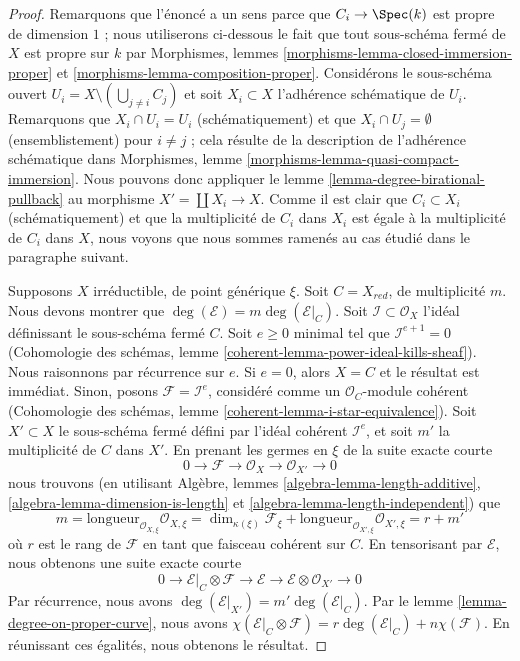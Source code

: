 \begin{proof}
Remarquons que l'énoncé a un sens parce que $C_i \to \Spec(k)$
est propre de dimension $1$ ; nous utiliserons ci-dessous le fait que tout sous-schéma fermé
de $X$ est propre sur $k$ par Morphismes, lemmes
\ref{morphisms-lemma-closed-immersion-proper} et
\ref{morphisms-lemma-composition-proper}. Considérons le sous-schéma ouvert
$U_i = X \setminus (\bigcup_{j \not = i} C_j)$ et soit $X_i \subset X$
l'adhérence schématique de $U_i$. Remarquons que $X_i \cap U_i = U_i$
(schématiquement) et que $X_i \cap U_j = \emptyset$
(ensemblistement) pour $i \not = j$ ; cela résulte de la description
de l'adhérence schématique dans
Morphismes, lemme \ref{morphisms-lemma-quasi-compact-immersion}.
Nous pouvons donc appliquer le lemme \ref{lemma-degree-birational-pullback} au morphisme
$X' = \coprod X_i \to X$. Comme il est clair que $C_i \subset X_i$
(schématiquement) et que la multiplicité de $C_i$ dans $X_i$ est égale
à la multiplicité de $C_i$ dans $X$, nous voyons que nous sommes ramenés au cas
étudié dans le paragraphe suivant.

\medskip\noindent
Supposons $X$ irréductible, de point générique $\xi$. Soit
$C = X_{red}$, de multiplicité $m$.
Nous devons montrer que $\deg(\mathcal{E}) = m \deg(\mathcal{E}|_C)$.
Soit $\mathcal{I} \subset \mathcal{O}_X$ l'idéal définissant le sous-schéma fermé
$C$. Soit $e \geq 0$ minimal tel que $\mathcal{I}^{e + 1} = 0$
(Cohomologie des schémas, lemme \ref{coherent-lemma-power-ideal-kills-sheaf}).
Nous raisonnons par récurrence sur $e$. Si $e = 0$, alors $X = C$ et le résultat
est immédiat. Sinon, posons $\mathcal{F} = \mathcal{I}^e$, considéré comme
un $\mathcal{O}_C$-module cohérent (Cohomologie des schémas, lemme
\ref{coherent-lemma-i-star-equivalence}).
Soit $X' \subset X$ le sous-schéma fermé défini par
l'idéal cohérent $\mathcal{I}^e$, et soit $m'$ la multiplicité
de $C$ dans $X'$. En prenant les germes en $\xi$ de la suite exacte courte
$$
0 \to \mathcal{F} \to \mathcal{O}_X \to \mathcal{O}_{X'} \to 0
$$
nous trouvons (en utilisant Algèbre, lemmes \ref{algebra-lemma-length-additive},
\ref{algebra-lemma-dimension-is-length} et
\ref{algebra-lemma-length-independent}) que
$$
m = \text{longueur}_{\mathcal{O}_{X, \xi}} \mathcal{O}_{X, \xi}
= \dim_{\kappa(\xi)} \mathcal{F}_\xi +
\text{longueur}_{\mathcal{O}_{X', \xi}} \mathcal{O}_{X', \xi}
= r + m'
$$
où $r$ est le rang de $\mathcal{F}$ en tant que faisceau cohérent sur $C$.
En tensorisant par $\mathcal{E}$, nous obtenons une suite exacte courte
$$
0 \to \mathcal{E}|_C \otimes \mathcal{F} \to \mathcal{E} \to
\mathcal{E} \otimes \mathcal{O}_{X'} \to 0
$$
Par récurrence, nous avons
$\deg(\mathcal{E}|_{X'}) = m' \deg(\mathcal{E}|_C)$.
Par le lemme \ref{lemma-degree-on-proper-curve}, nous avons
$\chi(\mathcal{E}|_C \otimes \mathcal{F}) =
r \deg(\mathcal{E}|_C) + n \chi(\mathcal{F})$.
En réunissant ces égalités, nous obtenons le résultat.
\end{proof}

